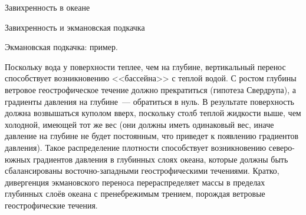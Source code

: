 \begin{chapter}{Завихренность в океане}
\begin{section}{Завихренность и экмановская подкачка}
\begin{paragraph}{Экмановская подкачка: пример.}

Поскольку вода у поверхности теплее, чем на глубине, вертикальный
перенос способствует возникновению <<бассейна>> с теплой водой. С ростом
глубины ветровое геострофическое течение должно прекратиться
(гипотеза Свердрупа), а градиенты давления на глубине~--- обратиться в нуль.
В результате поверхность должна возвышаться куполом вверх,
поскольку столб теплой жидкости выше, чем холодной, имеющей тот же вес 
(они должны иметь одинаковый вес, иначе давление на
глубине не будет постоянным, что приведет к появлению градиентов
давления). Такое распределение плотности способствует возникновению
северо-южных градиентов давления в глубинных слоях океана, которые
должны быть сбалансированы восточно-западными геострофическими
течениями. Кратко, дивергенция экмановского переноса
перераспределяет массы в пределах глубинных слоёв океана с пренебрежимым трением,
порождая ветровые геострофические течения.
%


\end{paragraph}
\end{section}
\end{chapter}
